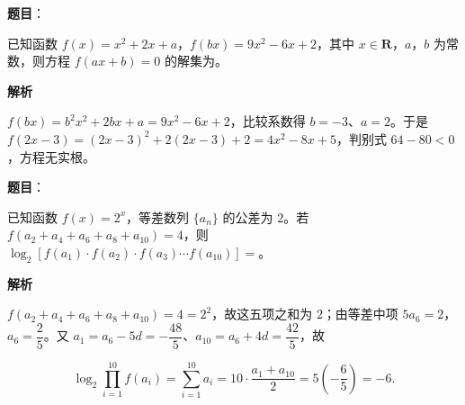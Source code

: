 \begin{answer}

\textbf{题目}：

已知函数 $f(x)=x^2+2x+a$，$f(bx)=9x^2-6x+2$，其中 $x\in\mathbf R$，$a$，$b$ 为常数，则方程 $f(ax+b)=0$ 的解集为\gkblank{}。

\textbf{解析}

$f(bx)=b^2x^2+2bx+a=9x^2-6x+2$，比较系数得 $b=-3$、$a=2$。于是 $f(2x-3)=(2x-3)^2+2(2x-3)+2=4x^2-8x+5$，判别式 $64-80<0$，方程无实根。


\end{answer}
\begin{answer}

\textbf{题目}：

已知函数 $f(x)=2^x$，等差数列 $\{a_n\}$ 的公差为 $2$。若 $f(a_2+a_4+a_6+a_8+a_{10})=4$，则 $\log_2[f(a_1)\cdot f(a_2)\cdot f(a_3)\cdots f(a_{10})]=$\gkblank{}。

\textbf{解析}

$f(a_2+a_4+a_6+a_8+a_{10})=4=2^2$，故这五项之和为 $2$；由等差中项 $5a_6=2$，$a_6=\dfrac25$。又 $a_1=a_6-5d=-\dfrac{48}5$、$a_{10}=a_6+4d=\dfrac{42}5$，故

\nopagebreak[4]
\[\log_2\prod_{i=1}^{10}f(a_i)=\sum_{i=1}^{10}a_i=10\cdot\frac{a_1+a_{10}}2=5\left(-\frac65\right)=-6.\]


\end{answer}
